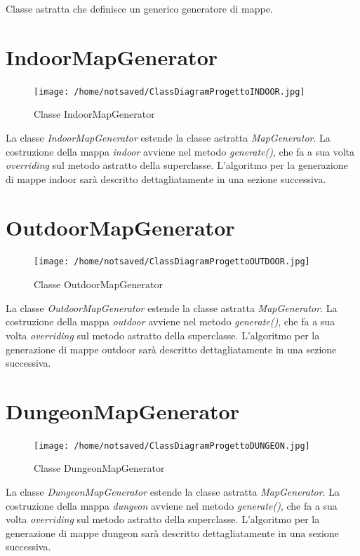 \documentclass[12pt]{book}
\begin{document}
Classe astratta che definisce un generico generatore di mappe.

\section{IndoorMapGenerator}

\begin{figure}[H]
\centering
\texttt{[image: /home/notsaved/ClassDiagramProgettoINDOOR.jpg]}
\caption{Classe IndoorMapGenerator}
\label{Classe IndoorMapGenerator}
\end{figure}

La classe \emph{IndoorMapGenerator} estende la classe astratta \emph{MapGenerator}. La costruzione della mappa \emph{indoor} avviene nel metodo \emph{generate()}, che fa a sua volta \emph{overriding} sul metodo astratto della superclasse. L'algoritmo per la generazione di mappe indoor sar\`a descritto dettagliatamente in una sezione successiva. 

\section{OutdoorMapGenerator}

\begin{figure}[H]
\centering
\texttt{[image: /home/notsaved/ClassDiagramProgettoOUTDOOR.jpg]}
\caption{Classe OutdoorMapGenerator}
\label{classoutdoorgenerator}
\end{figure}

La classe \emph{OutdoorMapGenerator} estende la classe astratta \emph{MapGenerator}. La costruzione della mappa \emph{outdoor} avviene nel metodo \emph{generate()}, che fa a sua volta \emph{overriding} sul metodo astratto della superclasse. L'algoritmo per la generazione di mappe outdoor sar\`a descritto dettagliatamente in una sezione successiva. 

\section{DungeonMapGenerator}

\begin{figure}[H]
\centering
\texttt{[image: /home/notsaved/ClassDiagramProgettoDUNGEON.jpg]}
\caption{Classe DungeonMapGenerator}
\label{classdungeonmap}
\end{figure}

La classe \emph{DungeonMapGenerator} estende la classe astratta \emph{MapGenerator}. La costruzione della mappa \emph{dungeon} avviene nel metodo \emph{generate()}, che fa a sua volta \emph{overriding} sul metodo astratto della superclasse. L'algoritmo per la generazione di mappe dungeon sar\`a descritto dettagliatamente in una sezione successiva. 
\end{document}
